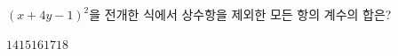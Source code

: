 $(x+4y-1)^2$을 전개한 식에서 상수항을 제외한 모든 항의 계수의 합은?
\begin{choices32}{$14$}{$15$}{$16$}{$17$}{$18$}\end{choices32}
